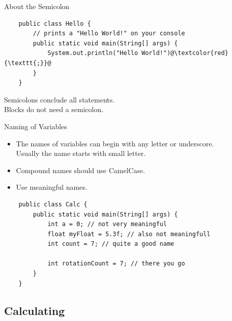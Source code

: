 \begin{frame}[fragile]{About the Semicolon}
	\begin{lstlisting}
	public class Hello {
	    // prints a "Hello World!" on your console
	    public static void main(String[] args) {
	        System.out.println("Hello World!")@\textcolor{red}{\texttt{;}}@
	    }
	}
	\end{lstlisting}
	Semicolons conclude all statements. \\
	Blocks do not need a semicolon.
\end{frame}

\begin{frame}[fragile]{Naming of Variables}
	\begin{itemize}
		\item The names of variables can begin with any letter or underscore. \\
		Usually the name starts with small letter.
		\item Compound names should use CamelCase.
		\item Use meaningful names.
	\end{itemize}
	\begin{lstlisting}
	public class Calc {
	    public static void main(String[] args) {
	    	int a = 0; // not very meaningful
	    	float myFloat = 5.3f; // also not meaningfull
	    	int count = 7; // quite a good name
	    	
	    	int rotationCount = 7; // there you go
	    }
	}
	\end{lstlisting}
\end{frame}

\subsection{Calculating}

